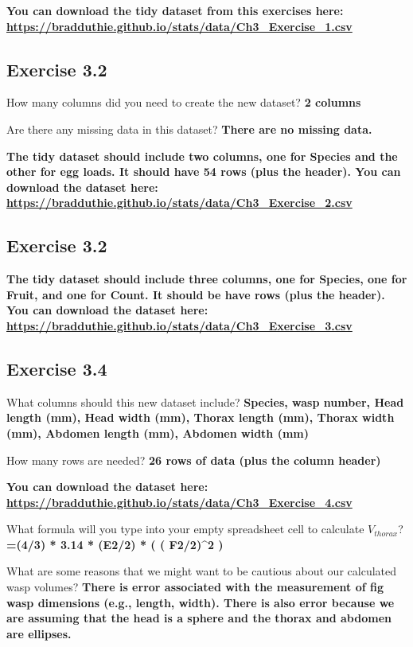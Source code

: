 \documentclass[
]{scrbook}
\begin{document}
\textbf{You can download the tidy dataset from this exercises here: \url{https://bradduthie.github.io/stats/data/Ch3_Exercise_1.csv}}

\hypertarget{exercise-3.2}{%
\subsection{Exercise 3.2}\label{exercise-3.2}}

How many columns did you need to create the new dataset? \textbf{2 columns}

Are there any missing data in this dataset? \textbf{There are no missing data.}

\textbf{The tidy dataset should include two columns, one for Species and the other for egg loads. It should have 54 rows (plus the header). You can download the dataset here: \url{https://bradduthie.github.io/stats/data/Ch3_Exercise_2.csv}}

\hypertarget{exercise-3.2-1}{%
\subsection{Exercise 3.2}\label{exercise-3.2-1}}

\textbf{The tidy dataset should include three columns, one for Species, one for Fruit, and one for Count. It should be have rows (plus the header). You can download the dataset here: \url{https://bradduthie.github.io/stats/data/Ch3_Exercise_3.csv}}

\hypertarget{exercise-3.4}{%
\subsection{Exercise 3.4}\label{exercise-3.4}}

What columns should this new dataset include? \textbf{Species, wasp number, Head length (mm), Head width (mm), Thorax length (mm), Thorax width (mm), Abdomen length (mm), Abdomen width (mm)}

How many rows are needed? \textbf{26 rows of data (plus the column header)}

\textbf{You can download the dataset here: \url{https://bradduthie.github.io/stats/data/Ch3_Exercise_4.csv}}

What formula will you type into your empty spreadsheet cell to calculate \(V_{thorax}\)? \textbf{=(4/3) * 3.14 * (E2/2) * ( ( F2/2)\^{}2 )}

What are some reasons that we might want to be cautious about our calculated wasp volumes? \textbf{There is error associated with the measurement of fig wasp dimensions (e.g., length, width). There is also error because we are assuming that the head is a sphere and the thorax and abdomen are ellipses.}
\end{document}
